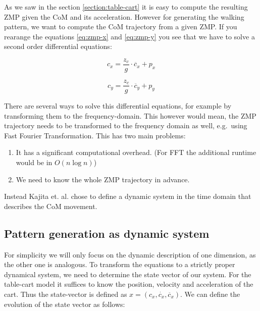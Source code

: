 \documentclass[english,ngerman]{KITreprt}
\begin{document}
As we saw in the section \ref{section:table-cart} it is easy to compute
the resulting ZMP given the CoM and its acceleration. However for
generating the walking pattern, we want to compute the CoM trajectory
from a given ZMP. If you rearange the equations \ref{eq:zmp-x} and
\ref{eq:zmp-y} you see that we have to solve a second order differential
equations:

\begin{equation} \label{eq:com-x}
c_x = \frac{z_c}{g} \cdot \ddot{c_x} + p_x
\end{equation}

\begin{equation} \label{eq:com-y}
c_y = \frac{z_c}{g} \cdot \ddot{c_y} + p_y
\end{equation}

There are several ways to solve this differential equations, for example
by transforming them to the frequency-domain. This however would mean,
the ZMP trajectory needs to be transformed to the frequency domain as
well, e.g.~using Fast Fourier Transformation. This has two main
problems:

\begin{enumerate}
\def\labelenumi{\arabic{enumi}.}
\item
  It has a significant computational overhead. (For FFT the additional
  runtime would be in $O(n \log n)$)
\item
  We need to know the whole ZMP trajectory in advance.
\end{enumerate}

Instead Kajita et. al. chose to define a dynamic system in the time
domain that describes the CoM movement.

\subsection{Pattern generation as dynamic
system}\label{pattern-generation-as-dynamic-system}

For simplicity we will only focus on the dynamic description of one
dimension, as the other one is analogous. To transform the equations to
a strictly proper dynamical system, we need to determine the state
vector of our system. For the table-cart model it suffices to know the
position, velocity and acceleration of the cart. Thus the state-vector
is defined as $x = (c_x, \dot{c_x}, \ddot{c_x})$. We can define the
evolution of the state vector as follows:
\end{document}
